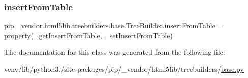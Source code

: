 \subsubsection{\texorpdfstring{insert\+From\+Table}{insertFromTable}}
{\footnotesize\ttfamily pip.\+\_\+vendor.\+html5lib.\+treebuilders.\+base.\+Tree\+Builder.\+insert\+From\+Table = property(\+\_\+get\+Insert\+From\+Table, \+\_\+set\+Insert\+From\+Table)\hspace{0.3cm}{\ttfamily [static]}}



The documentation for this class was generated from the following file\+:\begin{DoxyCompactItemize}
\item 
venv/lib/python3./site-\/packages/pip/\+\_\+vendor/html5lib/treebuilders/\hyperlink{__vendor_2html5lib_2treebuilders_2base_8py}{base.\+py}\end{DoxyCompactItemize}
